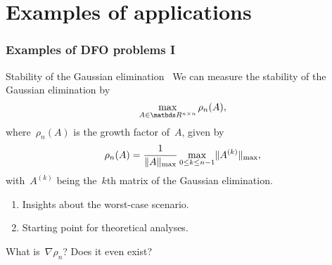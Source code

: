\documentclass{polyu-presentation}
\begin{document}
\section{Examples of applications}

\begin{frame}
    \frametitle{Examples of DFO problems I}

    \begin{block}{Stability of the Gaussian elimination~\parencite{Higham_1993}}
        We can measure the \alert{stability} of the \alert{Gaussian elimination} by
        \begin{equation*}
            \max_{A \in \R^{n \times n}} \rho_n(A),
        \end{equation*}
        where~$\rho_n(A)$ is the \alert{growth factor} of~$A$, given by
        \begin{equation*}
            \rho_n(A) = \frac{1}{\lVert A\rVert_{\max}} \max_{0 \le k \le n - 1} \lVert A^{(k)}\rVert_{\max},
        \end{equation*}
        with~$A^{(k)}$ being the~$k$th matrix of the Gaussian elimination.

        \begin{enumerate}
            \item Insights about the \alert{worst-case scenario}.
            \item Starting point for \alert{theoretical analyses}.
        \end{enumerate}
    \end{block}

    \medskip

    What is~\alert{$\nabla \rho_n$}? Does it even exist?
\end{frame}
\end{document}
